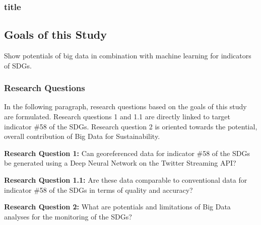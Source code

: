 			\subsubsection{title}
			
			
			
		\subsection{Goals of this Study}
		
		Show potentials of big data in combination with machine learning for indicators of SDGs.
		
		
		
			\subsubsection{Research Questions}
			
			In the following paragraph, research questions based on the goals of this study are formulated. Research questions 1 and 1.1 are directly linked to target indicator \#58 of the SDGs. Research question 2 is oriented towards the potential, overall contribution of Big Data for Sustainability.
			
			\bigbreak
			
			\begin{tcolorbox}
				\textbf{Research Question 1:} \smallbreak Can georeferenced data for indicator \#58 of the SDGs be generated using a Deep Neural Network on the Twitter Streaming API?
			\end{tcolorbox}
			
			\bigbreak
				
				\begin{tcolorbox}
					\textbf{Research Question 1.1:} \smallbreak Are these data comparable to conventional data for indicator \#58 of the SDGs in terms of quality and accuracy?
				\end{tcolorbox}
				
			\bigbreak
				
				\begin{tcolorbox}
					\textbf{Research Question 2:} \smallbreak What are potentials and limitations of Big Data analyses for the monitoring of the SDGs?
				\end{tcolorbox}

			\bigbreak
				
	
			